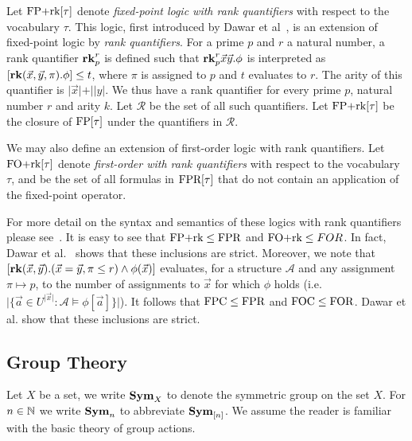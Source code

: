 \documentclass[../paper.tex]{subfiles}
\begin{document}
Let $\text{\upshape FP+rk}[\tau]$ denote \emph{fixed-point logic with rank quantifiers} with
respect to the vocabulary $\tau$. This logic, first introduced by Dawar et
al~\cite{Dawar09logicswith}, is an extension of fixed-point logic by \emph{rank
  quantifiers}. For a prime $p$ and $r$ a natural number, a rank quantifier
$\text{\textbf{rk}}^r_p$ is defined such that $\text{\textbf{rk}}^r_p\vec{x}\vec{y}. \phi$ is interpreted
as $[\text{\textbf{rk}} (\vec{x}, \vec{y}, \pi) . \phi] \leq t$, where $\pi$ is assigned to
$p$ and $t$ evaluates to $r$. The arity of this quantifier is $\vert \vec{x}
\vert + \vert \vert{y} \vert$. We thus have a rank quantifier for every prime
$p$, natural number $r$ and arity $k$. Let $\mathcal{R}$ be the set of all such
quantifiers. Let $\text{\upshape FP+rk}[\tau]$ be the closure of $\text{\upshape FP}[\tau]$ under the
quantifiers in $\mathcal{R}$.

We may also define an extension of first-order logic with rank quantifiers. Let
$\text{\upshape FO+rk}[\tau]$ denote \emph{first-order with rank quantifiers} with respect to
the vocabulary $\tau$, and be the set of all formulas in $\text{\upshape FPR}[\tau]$ that do
not contain an application of the fixed-point operator.

For more detail on the syntax and semantics of these logics with rank
quantifiers please see~\cite{Dawar09logicswith}. It is easy to see that $\text{\upshape FP+rk}
\leq \text{\upshape FPR}$ and $\text{\upshape FO+rk} \leq FOR$. In fact, Dawar et al.~\cite{Dawar09logicswith}
shows that these inclusions are strict. Moreover, we note that $[\text{\textbf{rk}}(\vec{x},
\vec{y}). (\vec{x} = \vec{y}, \pi \leq r) \land \phi(\vec{x})]$ evaluates, for a
structure $\mathcal{A}$ and any assignment $\pi \mapsto p$, to the number of
assignments to $\vec{x}$ for which $\phi$ holds (i.e.\ $\vert \{\vec{a} \in
U^{\vert \vec{x} \vert} : \mathcal{A} \models \phi[\vec{a}]\} \vert$). It
follows that $\text{\upshape FPC} \leq \text{\upshape FPR}$ and $\text{\upshape FOC} \leq \text{\upshape FOR}$. Dawar et
al.\cite{Dawar09logicswith} show that these inclusions are strict.

\subsection{Group Theory}
Let $X$ be a set, we write $\text{\textbf{Sym}}_X$ to denote the symmetric group on the set
$X$. For $n \in \mathbb{N}$ we write $\text{\textbf{Sym}}_n$ to abbreviate $\text{\textbf{Sym}}_{[n]}$. We assume
the reader is familiar with the basic theory of group actions.
\end{document}
